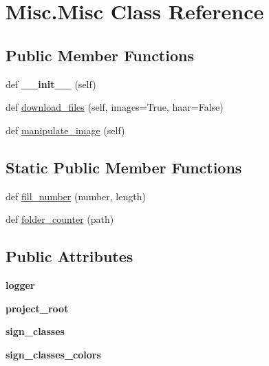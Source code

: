 \hypertarget{class_misc_1_1_misc}{}\section{Misc.\+Misc Class Reference}
\label{class_misc_1_1_misc}
\subsection*{Public Member Functions}
\begin{DoxyCompactItemize}
\item 
\mbox{\label{class_misc_1_1_misc_a2361f15b11e4875dff86f4bedf58dc31}} 
def {\bfseries \+\_\+\+\_\+init\+\_\+\+\_\+} (self)
\item 
def \mbox{\hyperlink{class_misc_1_1_misc_af3f58245bac7eefdc5a266a06bd1cb85}{download\+\_\+files}} (self, images=True, haar=False)
\item 
def \mbox{\hyperlink{class_misc_1_1_misc_aaeb87b754b9e7b39fcf5c39e6b34a1ae}{manipulate\+\_\+image}} (self)
\end{DoxyCompactItemize}
\subsection*{Static Public Member Functions}
\begin{DoxyCompactItemize}
\item 
def \mbox{\hyperlink{class_misc_1_1_misc_a58fba0bed4c5f2ff76cdf83e20670fb4}{fill\+\_\+number}} (number, length)
\item 
def \mbox{\hyperlink{class_misc_1_1_misc_a8d30d14e25c28f7f8ac3798e501d4aaa}{folder\+\_\+counter}} (path)
\end{DoxyCompactItemize}
\subsection*{Public Attributes}
\begin{DoxyCompactItemize}
\item 
\mbox{\label{class_misc_1_1_misc_a9e3b421db2e29f51ea2ccf751dc3be28}} 
{\bfseries logger}
\item 
\mbox{\label{class_misc_1_1_misc_a0f0f549a61cc2c0682e3168d7e5d179d}} 
{\bfseries project\+\_\+root}
\item 
\mbox{\label{class_misc_1_1_misc_a18a052f60a59bcbb8c50936ed0e19501}} 
{\bfseries sign\+\_\+classes}
\item 
\mbox{\label{class_misc_1_1_misc_a3956381cbf1848ff93d562dad430dc36}} 
{\bfseries sign\+\_\+classes\+\_\+colors}
\end{DoxyCompactItemize}


